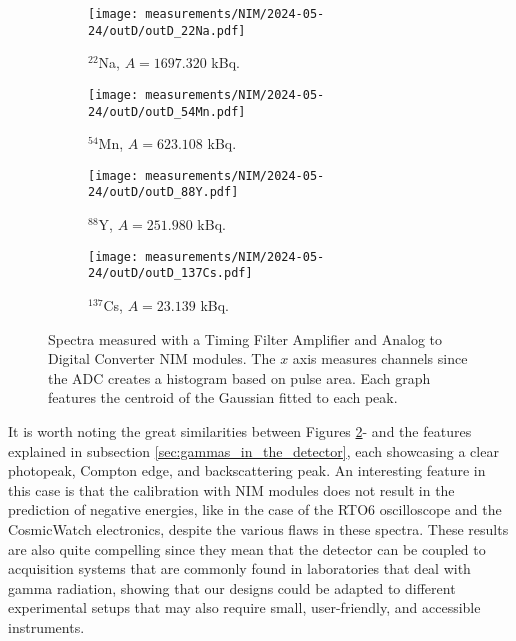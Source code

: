 \begin{figure}[H]
  \begin{subfigure}[t]{0.47\textwidth}
    \centering
    \texttt{[image: measurements/NIM/2024-05-24/outD/outD\_22Na.pdf]}
    \caption{\label{sfig:NIM_22Na}$^{22}$Na, $A=1697.320$ kBq.}
  \end{subfigure}
  \hfill
  \begin{subfigure}[t]{0.47\textwidth}
    \centering
    \texttt{[image: measurements/NIM/2024-05-24/outD/outD\_54Mn.pdf]}
    \caption{\label{sfig:NIM_54Mn}$^{54}$Mn, $A=623.108$ kBq.}
  \end{subfigure}
  \medskip
  \begin{subfigure}[t]{0.47\textwidth}
    \centering
    \texttt{[image: measurements/NIM/2024-05-24/outD/outD\_88Y.pdf]}
    \caption{\label{sfig:NIM_88Y}$^{88}$Y, $A=251.980$ kBq.}
  \end{subfigure}
  \hfill
  \begin{subfigure}[t]{0.47\textwidth}
    \centering
    \texttt{[image: measurements/NIM/2024-05-24/outD/outD\_137Cs.pdf]}
    \caption{\label{sfig:NIM_137Cs}$^{137}$Cs, $A=23.139$ kBq.}
  \end{subfigure}
  \caption{\label{fig:NIM_spectra}Spectra measured with a Timing Filter Amplifier and Analog to Digital Converter NIM modules. The $x$ axis measures channels since the ADC creates a histogram based on pulse area. Each graph features the centroid of the Gaussian fitted to each peak.}
\end{figure}

It is worth noting the great similarities between Figures \ref{sfig:NIM_54Mn}- and the features explained in subsection \ref{sec:gammas_in_the_detector}, each showcasing a clear photopeak, Compton edge, and backscattering peak. An interesting feature in this case is that the calibration with NIM modules does not result in the prediction of negative energies, like in the case of the RTO6 oscilloscope and the CosmicWatch electronics, despite the various flaws in these spectra. These results are also quite compelling since they mean that the detector can be coupled to acquisition systems that are commonly found in laboratories that deal with gamma radiation, showing that our designs could be adapted to different experimental setups that may also require small, user-friendly, and accessible instruments.

